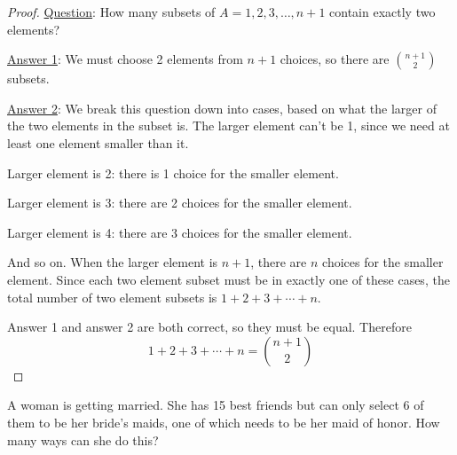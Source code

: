 \begin{questions}
	\begin{answer}
	\begin{proof}
        \underline{Question}: How many subsets of $A = {1,2,3, \ldots, n+1}$ contain exactly two elements?
        
        \underline{Answer 1}: We must choose 2 elements from $n+1$ choices, so there are ${n+1 \choose 2}$ subsets.
        
        \underline{Answer 2}: We break this question down into cases, based on what the larger of the two elements in the subset is. The larger element can't be 1, since we need at least one element smaller than it.
        
        Larger element is 2: there is 1 choice for the smaller element.
        
        Larger element is 3: there are 2 choices for the smaller element.
        
        Larger element is 4: there are 3 choices for the smaller element.
        
        And so on.  When the larger element is $n+1$, there are $n$ choices for the smaller element.  Since each two element subset must be in exactly one of these cases, the total number of two element subsets is $1 + 2 + 3 + \cdots + n$.
        
        Answer 1 and answer 2 are both correct, so they must be equal.  Therefore
        \[1 + 2 + 3 + \cdots + n = {n+1 \choose 2}\]
       \end{proof}
	\end{answer}
	
	
	
	
	
\question A woman is getting married.  She has 15 best friends but can only select 6 of them to be her bride's maids, one of which needs to be her maid of honor.  How many ways can she do this?
	

\end{questions}
